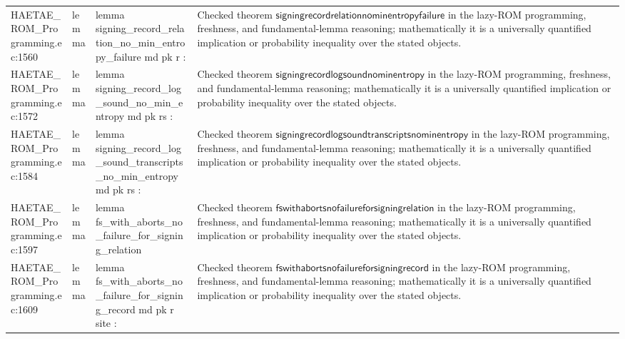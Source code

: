 \documentclass[10pt]{article}
\begin{document}
\begin{longtable}{L{0.11\textwidth}L{0.055\textwidth}L{0.385\textwidth}L{0.41\textwidth}}
HAETAE\_\allowbreak{}ROM\_\allowbreak{}Programming.\allowbreak{}ec:\allowbreak{}1560 & lemma & {\ttfamily\scriptsize lemma signing\_\allowbreak{}record\_\allowbreak{}relation\_\allowbreak{}no\_\allowbreak{}min\_\allowbreak{}entropy\_\allowbreak{}failure md pk r :} & Checked theorem $\mathsf{signingrecordrelationnominentropyfailure}$ in the lazy-ROM programming, freshness, and fundamental-lemma reasoning; mathematically it is a universally quantified implication or probability inequality over the stated objects. \\
HAETAE\_\allowbreak{}ROM\_\allowbreak{}Programming.\allowbreak{}ec:\allowbreak{}1572 & lemma & {\ttfamily\scriptsize lemma signing\_\allowbreak{}record\_\allowbreak{}log\_\allowbreak{}sound\_\allowbreak{}no\_\allowbreak{}min\_\allowbreak{}entropy md pk rs :} & Checked theorem $\mathsf{signingrecordlogsoundnominentropy}$ in the lazy-ROM programming, freshness, and fundamental-lemma reasoning; mathematically it is a universally quantified implication or probability inequality over the stated objects. \\
HAETAE\_\allowbreak{}ROM\_\allowbreak{}Programming.\allowbreak{}ec:\allowbreak{}1584 & lemma & {\ttfamily\scriptsize lemma signing\_\allowbreak{}record\_\allowbreak{}log\_\allowbreak{}sound\_\allowbreak{}transcripts\_\allowbreak{}no\_\allowbreak{}min\_\allowbreak{}entropy md pk rs :} & Checked theorem $\mathsf{signingrecordlogsoundtranscriptsnominentropy}$ in the lazy-ROM programming, freshness, and fundamental-lemma reasoning; mathematically it is a universally quantified implication or probability inequality over the stated objects. \\
HAETAE\_\allowbreak{}ROM\_\allowbreak{}Programming.\allowbreak{}ec:\allowbreak{}1597 & lemma & {\ttfamily\scriptsize lemma fs\_\allowbreak{}with\_\allowbreak{}aborts\_\allowbreak{}no\_\allowbreak{}failure\_\allowbreak{}for\_\allowbreak{}signing\_\allowbreak{}relation} & Checked theorem $\mathsf{fswithabortsnofailureforsigningrelation}$ in the lazy-ROM programming, freshness, and fundamental-lemma reasoning; mathematically it is a universally quantified implication or probability inequality over the stated objects. \\
HAETAE\_\allowbreak{}ROM\_\allowbreak{}Programming.\allowbreak{}ec:\allowbreak{}1609 & lemma & {\ttfamily\scriptsize lemma fs\_\allowbreak{}with\_\allowbreak{}aborts\_\allowbreak{}no\_\allowbreak{}failure\_\allowbreak{}for\_\allowbreak{}signing\_\allowbreak{}record md pk r site :} & Checked theorem $\mathsf{fswithabortsnofailureforsigningrecord}$ in the lazy-ROM programming, freshness, and fundamental-lemma reasoning; mathematically it is a universally quantified implication or probability inequality over the stated objects. \\

\end{longtable}
\end{document}
